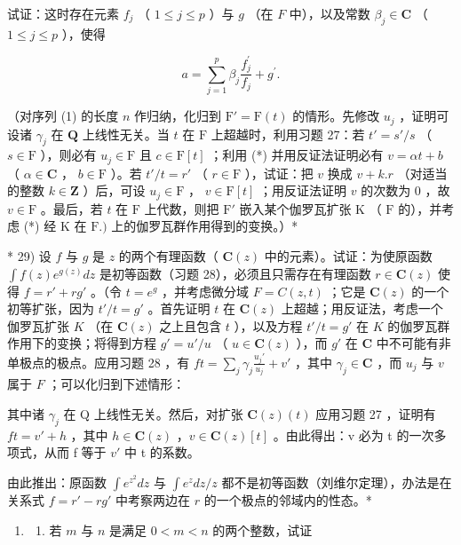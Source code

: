 试证：这时存在元素 \(f_{j}\) （ \(1 \leqslant j \leqslant p\) ）与 \(g\) （在 \(F\) 中），以及常数 \(\beta_{j} \in \mathbf{C}\) （ \(1 \leqslant j \leqslant p\) ），使得

\[
a = \sum_ {j = 1} ^ {p} \beta_ {j} \frac {f _ {j} ^ {\prime}}{f _ {j}} + g ^ {\prime}.\tag{**}
\]

（对序列 (1) 的长度 \(n\) 作归纳，化归到 \(\mathrm{F}' = \mathrm{F}(t)\) 的情形。先修改 \(u_{j}\) ，证明可设诸 \(\gamma_{j}\) 在 \(\mathbf{Q}\) 上线性无关。当 \(t\) 在 \(\mathrm{F}\) 上超越时，利用习题 27：若 \(t' = s'/s\) （ \(s \in \mathrm{F}\) ），则必有 \(u_{j} \in \mathrm{F}\) 且 \(c \in \mathrm{F}[t]\) ；利用 (*) 并用反证法证明必有 \(v = \alpha t + b\) （ \(\alpha \in \mathbf{C}\) ， \(b \in \mathrm{F}\) ）。若 \(t'/t = r'\) （ \(r \in \mathrm{F}\) ），试证：把 \(v\) 换成 \(v + k.r\) （对适当的整数 \(k \in \mathbf{Z}\) ）后，可设 \(u_{j} \in \mathrm{F}\) ， \(v \in \mathrm{F}[t]\) ；用反证法证明 \(v\) 的次数为 0 ，故 \(v \in \mathrm{F}\) 。最后，若 \(t\) 在 \(\mathrm{F}\) 上代数，则把 \(\mathrm{F}'\) 嵌入某个伽罗瓦扩张 \(\mathrm{K}\) （ \(\mathrm{F}\) 的），并考虑 (*) 经 \(\mathrm{K}\) 在 \(\mathrm{F}.)\) 上的伽罗瓦群作用得到的变换。）*

* 29) 设 \(f\) 与 \(g\) 是 \(z\) 的两个有理函数（ \(\mathbf{C}(z)\) 中的元素）。试证：为使原函数 \(\int f(z)e^{g(z)}dz\) 是初等函数（习题 28），必须且只需存在有理函数 \(r\in \mathbf{C}(z)\) 使得 \(f = r' + rg'\) 。（令 \(t = e^g\) ，并考虑微分域 \(F = C(z,t)\) ；它是 \(\mathbf{C}(z)\) 的一个初等扩张，因为 \(t' / t = g'\) 。首先证明 \(t\) 在 \(\mathbf{C}(z)\) 上超越；用反证法，考虑一个伽罗瓦扩张 \(K\) （在 \(\mathbf{C}(z)\) 之上且包含 \(t\) ），以及方程 \(t' / t = g'\) 在 \(K\) 的伽罗瓦群作用下的变换；将得到方程 \(g' = u' / u\) （ \(u\in \mathbf{C}(z)\) ），而 \(g'\) 在 \(\mathbf{C}\) 中不可能有非单极点的极点。应用习题 28 ，有 \(ft = \sum_{j}\gamma_{j}\frac{u_{j}'}{u_{j}} +v'\) ，其中 \(\gamma_{j}\in \mathbf{C}\) ，而 \(u_{j}\) 与 \(v\) 属于 \(F\) ；可以化归到下述情形：

其中诸 \(\gamma_{j}\) 在 Q 上线性无关。然后，对扩张 \(\mathbf{C}(z)(t)\) 应用习题 27 ，证明有 \(ft = v' + h\) ，其中 \(h \in \mathbf{C}(z)\) ，\(v \in \mathbf{C}(z)[t]\) 。由此得出：v 必为 t 的一次多项式，从而 f 等于 \(v'\) 中 t 的系数。

由此推出：原函数 \(\int e^{z^2}dz\) 与 \(\int e^z dz / z\) 都不是初等函数（刘维尔定理），办法是在关系式 \(f = r' - rg'\) 中考察两边在 \(r\) 的一个极点的邻域内的性态。*

\begin{enumerate}
\def\labelenumi{\arabic{enumi})}
\setcounter{enumi}{29}
\tightlist
\item
  \begin{enumerate}
  \def\labelenumii{\alph{enumii})}
  \tightlist
  \item
    若 \(m\) 与 \(n\) 是满足 \(0 < m < n\) 的两个整数，试证
  \end{enumerate}
\end{enumerate}

